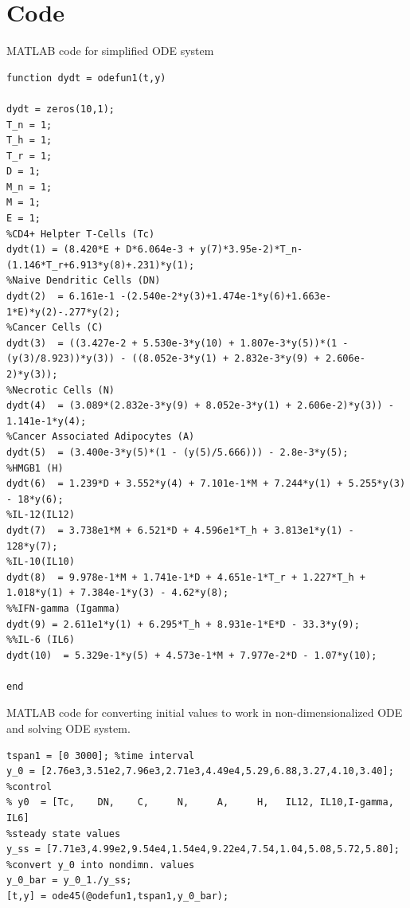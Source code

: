 \documentclass{article}
\begin{document}
\section{Code}
\label{appendix:code}
MATLAB code for simplified ODE system
\begin{lstlisting}
function dydt = odefun1(t,y)

dydt = zeros(10,1);
T_n = 1;
T_h = 1;
T_r = 1;
D = 1;
M_n = 1;
M = 1;
E = 1;
%CD4+ Helpter T-Cells (Tc)
dydt(1) = (8.420*E + D*6.064e-3 + y(7)*3.95e-2)*T_n-(1.146*T_r+6.913*y(8)+.231)*y(1);
%Naive Dendritic Cells (DN)
dydt(2)  = 6.161e-1 -(2.540e-2*y(3)+1.474e-1*y(6)+1.663e-1*E)*y(2)-.277*y(2);
%Cancer Cells (C)
dydt(3)  = ((3.427e-2 + 5.530e-3*y(10) + 1.807e-3*y(5))*(1 - (y(3)/8.923))*y(3)) - ((8.052e-3*y(1) + 2.832e-3*y(9) + 2.606e-2)*y(3));
%Necrotic Cells (N)
dydt(4)  = (3.089*(2.832e-3*y(9) + 8.052e-3*y(1) + 2.606e-2)*y(3)) - 1.141e-1*y(4); 
%Cancer Associated Adipocytes (A)
dydt(5)  = (3.400e-3*y(5)*(1 - (y(5)/5.666))) - 2.8e-3*y(5); 
%HMGB1 (H)
dydt(6)  = 1.239*D + 3.552*y(4) + 7.101e-1*M + 7.244*y(1) + 5.255*y(3) - 18*y(6);
%IL-12(IL12)
dydt(7)  = 3.738e1*M + 6.521*D + 4.596e1*T_h + 3.813e1*y(1) - 128*y(7);
%IL-10(IL10)
dydt(8)  = 9.978e-1*M + 1.741e-1*D + 4.651e-1*T_r + 1.227*T_h + 1.018*y(1) + 7.384e-1*y(3) - 4.62*y(8);
%%IFN-gamma (Igamma)
dydt(9) = 2.611e1*y(1) + 6.295*T_h + 8.931e-1*E*D - 33.3*y(9);
%%IL-6 (IL6)
dydt(10)  = 5.329e-1*y(5) + 4.573e-1*M + 7.977e-2*D - 1.07*y(10);

end
\end{lstlisting}
MATLAB code for converting initial values to work in non-dimensionalized ODE and solving ODE system.
\begin{lstlisting}
tspan1 = [0 3000]; %time interval
y_0 = [2.76e3,3.51e2,7.96e3,2.71e3,4.49e4,5.29,6.88,3.27,4.10,3.40]; %control
% y0  = [Tc,    DN,    C,     N,     A,     H,   IL12, IL10,I-gamma, IL6]
%steady state values
y_ss = [7.71e3,4.99e2,9.54e4,1.54e4,9.22e4,7.54,1.04,5.08,5.72,5.80];
%convert y_0 into nondimn. values
y_0_bar = y_0_1./y_ss;
[t,y] = ode45(@odefun1,tspan1,y_0_bar);
\end{lstlisting}
\end{document}
